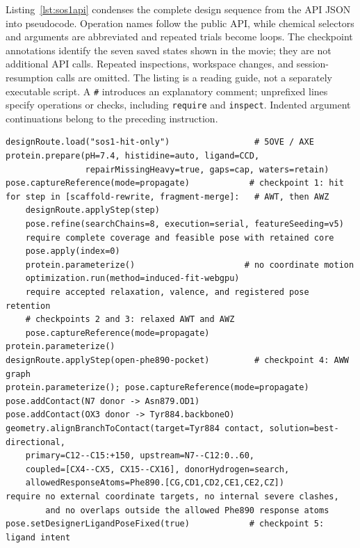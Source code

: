 \documentclass[11pt]{article}
\begin{document}
\begin{small}
Listing~\ref{lst:sos1api} condenses the complete design sequence from the API JSON into pseudocode. Operation names follow the public API, while chemical selectors and arguments are abbreviated and repeated trials become loops. The checkpoint annotations identify the seven saved states shown in the movie; they are not additional API calls. Repeated inspections, workspace changes, and session-resumption calls are omitted. The listing is a reading guide, not a separately executable script. A \texttt{\#} introduces an explanatory comment; unprefixed lines specify operations or checks, including \texttt{require} and \texttt{inspect}. Indented argument continuations belong to the preceding instruction.

\begin{minipage}{\linewidth}
\begin{lstlisting}[language={},basicstyle=\ttfamily\footnotesize,caption={The whole SOS1 movie as pseudocode condensed from the public API action script. Angles are in degrees; distances are in angstroms unless stated otherwise.},label={lst:sos1api}]
designRoute.load("sos1-hit-only")                 # 5OVE / AXE
protein.prepare(pH=7.4, histidine=auto, ligand=CCD,
                repairMissingHeavy=true, gaps=cap, waters=retain)
pose.captureReference(mode=propagate)            # checkpoint 1: hit
for step in [scaffold-rewrite, fragment-merge]:   # AWT, then AWZ
    designRoute.applyStep(step)
    pose.refine(searchChains=8, execution=serial, featureSeeding=v5)
    require complete coverage and feasible pose with retained core
    pose.apply(index=0)
    protein.parameterize()                      # no coordinate motion
    optimization.run(method=induced-fit-webgpu)
    require accepted relaxation, valence, and registered pose retention
    # checkpoints 2 and 3: relaxed AWT and AWZ
    pose.captureReference(mode=propagate)
protein.parameterize()
designRoute.applyStep(open-phe890-pocket)         # checkpoint 4: AWW graph
protein.parameterize(); pose.captureReference(mode=propagate)
pose.addContact(N7 donor -> Asn879.OD1)
pose.addContact(OX3 donor -> Tyr884.backboneO)
geometry.alignBranchToContact(target=Tyr884 contact, solution=best-directional,
    primary=C12--C15:+150, upstream=N7--C12:0..60,
    coupled=[CX4--CX5, CX15--CX16], donorHydrogen=search,
    allowedResponseAtoms=Phe890.[CG,CD1,CD2,CE1,CE2,CZ])
require no external coordinate targets, no internal severe clashes,
        and no overlaps outside the allowed Phe890 response atoms
pose.setDesignerLigandPoseFixed(true)            # checkpoint 5: ligand intent

\end{lstlisting}
\end{minipage}
\end{small}
\end{document}
